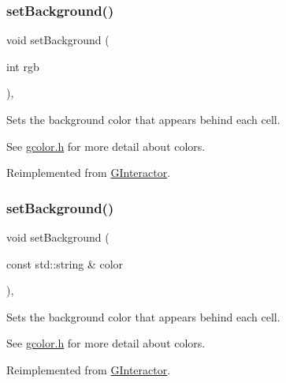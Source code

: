 \subsubsection{\texorpdfstring{set\+Background()}{setBackground()}\hspace{0.1cm}{\footnotesize\ttfamily [1/2]}}
{\footnotesize\ttfamily void set\+Background (\begin{DoxyParamCaption}\item[{int}]{rgb }\end{DoxyParamCaption})\hspace{0.3cm}{\ttfamily [override]}, {\ttfamily [virtual]}}



Sets the background color that appears behind each cell. 

See \mbox{\hyperlink{gcolor_8h_source}{gcolor.\+h}} for more detail about colors. 

Reimplemented from \mbox{\hyperlink{classsgl_1_1GInteractor_acba7e546c2025c0a15ca4b4cc92043db}{G\+Interactor}}.

\mbox{\label{classsgl_1_1GTable_a9cb99695b93494c7ba28268ce9e42c2a}} 
\subsubsection{\texorpdfstring{set\+Background()}{setBackground()}\hspace{0.1cm}{\footnotesize\ttfamily [2/2]}}
{\footnotesize\ttfamily void set\+Background (\begin{DoxyParamCaption}\item[{const std\+::string \&}]{color }\end{DoxyParamCaption})\hspace{0.3cm}{\ttfamily [override]}, {\ttfamily [virtual]}}



Sets the background color that appears behind each cell. 

See \mbox{\hyperlink{gcolor_8h_source}{gcolor.\+h}} for more detail about colors. 

Reimplemented from \mbox{\hyperlink{classsgl_1_1GInteractor_ab4677ab2474e68b07aa56605af92a84a}{G\+Interactor}}.

\mbox{\label{classsgl_1_1GInteractor_a2aae8197624b72265ab83b4f1bc73f2f}} 
